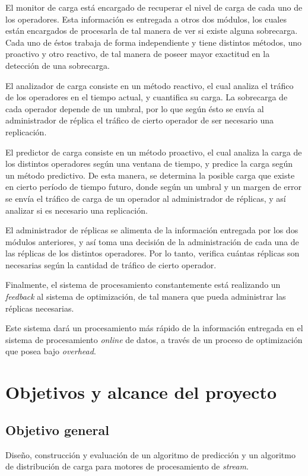 El monitor de carga está encargado de recuperar el nivel de carga de cada uno de los operadores. Esta información es entregada a otros dos módulos, los cuales están encargados de procesarla de tal manera de ver si existe alguna sobrecarga. Cada uno de éstos trabaja de forma independiente y tiene distintos métodos, uno proactivo y otro reactivo, de tal manera de poseer mayor exactitud en la detección de una sobrecarga.

El analizador de carga consiste en un método reactivo, el cual analiza el tráfico de los operadores en el tiempo actual, y cuantifica su carga. La sobrecarga de cada operador depende de un umbral, por lo que según ésto se envía al administrador de réplica el tráfico de cierto operador de ser necesario una replicación.

El predictor de carga consiste en un método proactivo, el cual analiza la carga de los distintos operadores según una ventana de tiempo, y predice la carga según un método predictivo. De esta manera, se determina la posible carga que existe en cierto período de tiempo futuro, donde según un umbral y un margen de error se envía el tráfico de carga de un operador al administrador de réplicas, y así analizar si es necesario una replicación.

El administrador de réplicas se alimenta de la información entregada por los dos módulos anteriores, y así toma una decisión de la administración de cada una de las réplicas de los distintos operadores. Por lo tanto, verifica cuántas réplicas son necesarias según la cantidad de tráfico de cierto operador.

Finalmente, el sistema de procesamiento constantemente está realizando un \textsl{feedback} al sistema de optimización, de tal manera que pueda administrar las réplicas necesarias.

Este sistema dar\'a un procesamiento más rápido de la información entregada en el sistema de procesamiento \textsl{online} de datos, a través de un proceso de optimización que posea bajo \textsl{overhead}.


\section{Objetivos y alcance del proyecto}
\label{intro:objetivos}

\subsection{Objetivo general}
	Dise\~no, construcción y evaluaci\'on de un algoritmo de predicci\'on y un algoritmo de distribuci\'on de carga para motores de procesamiento de \textsl{stream}.


